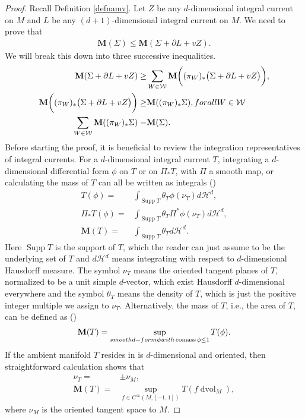 \documentclass[11pt,a4paper]{amsart}
\numberwithin{equation}{section}
\newcommand{\supp}{\operatorname{Supp}}
\newcommand{\hm}{\mathcal{H}}
\newcommand{\Si}{\Sigma}
\newcommand{\ta}{\theta}
\newcommand{\cms}{\operatorname{comass}}
\newcommand{\ms}{\mathbf{M}}
\newcommand{\dvol}{\operatorname{dvol}}
\newcommand{\du}{^\ast}
\newcommand{\pf}{_\ast}
\newcommand{\pd}{\partial}
\theoremstyle{plain}
\theoremstyle{definition}
\numberwithin{equation}{subsection}
\begin{document}
\begin{proof}
 Recall Definition \ref{defnamv}. Let $Z$ be any $d$-dimensional integral current on $M$ and $L$ be any $(d+1)$-dimensional integral current on $M.$ We need to prove that
\begin{align}
\label{ineq0}	\ms(\Si)\le\ms(\Si+\pd L+vZ).
\end{align}
We will break this down into three successive inequalities.
	\begin{align}
\label{ineq1}		\ms(\Si+\pd L+vZ)\ge&\sum_{W\in\mathcal{W}}\ms\bigg((\pi_W)\pf \big(\Si+\pd L+vZ\big)\bigg),\\
		\label{ineq2}\ms\bigg((\pi_W)\pf \big(\Si+\pd L+vZ\big)\bigg)\ge &\ms((\pi_W)\pf \Si),\textnormal{ for all }W\in\mathcal{W}\\
		\label{ineq3}\sum_{W\in\mathcal{W}}\ms((\pi_W)\pf \Si)=&\ms(\Si).			\end{align}
Before starting the proof, it is beneficial to review the integration representatives of integral currents. For a $d$-dimensional integral current $T$, integrating a $d$-dimensional differential form $\phi$ on $T$ or on $\Pi\pf T$, with $\Pi$ a smooth map, or calculating the mass of $T$ can all be written as integrals   (\cite[Theorem 4.1.28 (4)]{HF})
\begin{align}
	T(\phi)=&\int_{\supp T}\ta_T \phi(\nu_T)d\hm^d,\\
	\Pi\pf	T(\phi)=&\int_{\supp T}\ta_T \Pi\du\phi(\nu_T)d\hm^d,\\
	\label{eqint}	\ms(T)=&\int_{\supp T}\ta_T d\hm^d.
\end{align}
Here $\supp T$ is the support of $T$, which the reader can just assume to be the underlying set of $T$ and $d\hm^d$ means integrating with respect to $d$-dimensional Hausdorff measure. The symbol $\nu_T$ means the oriented tangent planes of $T$, normalized to be a unit simple $d$-vector, which exist Hausdorff $d$-dimensional everywhere and the symbol $\ta_T$ means the density of $T$, which is just the positive integer multiple we assign to $\nu_T$. Alternatively, the mass of $T$, i.e., the area of $T$, can be defined as
(\cite[p. 358 Section 4.1.7]{HF})
\begin{align}\label{eqintm}
	\ms(T)=\sup_{\textnormal{smooth }d\textnormal{-form }\phi\textnormal{ with }\cms\phi\le 1}T(\phi).
\end{align}
If the ambient manifold $T$ resides in is $d$-dimensional and oriented, then straightforward calculation shows that
\begin{align}	
\label{eqdst}	\nu_T=&\pm \nu_M,\\
\label{eqintma}	\ms(T)=&\sup_{f\in C^\infty(M,[-1,1])}T(f\dvol_M),
\end{align}
where $\nu_M$ is the oriented tangent space to $M.$
		

\end{proof}
\end{document}
